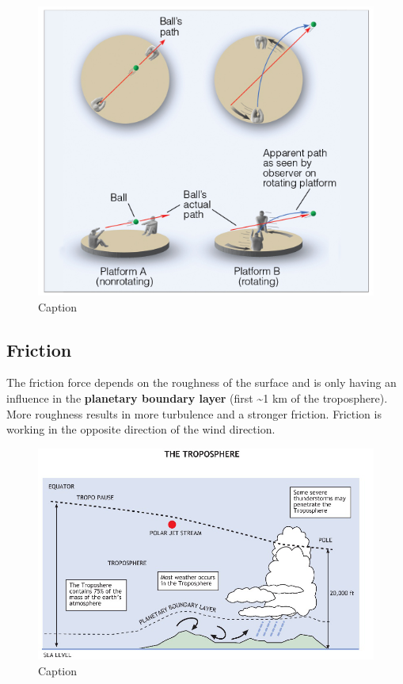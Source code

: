 \documentclass[12pt,oneside]{book}
\begin{document}
\begin{figure}

{\centering \includegraphics[width=0.8\linewidth]{figures/Figure46} 

}

\caption{Caption}\label{fig:Coriolis}
\end{figure}

\subsection{Friction}\label{friction}

The friction force depends on the roughness of the surface and is only
having an influence in the \textbf{planetary boundary layer} (first
\textasciitilde{}1 km of the troposphere). More roughness results in
more turbulence and a stronger friction. Friction is working in the
opposite direction of the wind direction.

\begin{figure}

{\centering \includegraphics[width=0.8\linewidth]{figures/Figure47} 

}

\caption{Caption}\label{fig:Friction}
\end{figure}
\end{document}
